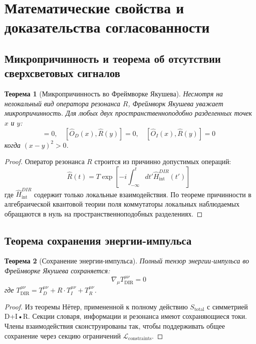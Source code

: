 \documentclass[11pt,a4paper]{article}
\newtheorem{theorem}{Теорема}
\begin{document}
	\section{Математические свойства и доказательства согласованности}
	\subsection{Микропричинность и теорема об отсутствии сверхсветовых сигналов}
	
	\begin{theorem}[Микропричинность во Фреймворке Якушева]
		Несмотря на нелокальный вид оператора резонанса $R$, Фреймворк Якушева уважает микропричинность. Для любых двух пространственноподобно разделенных точек $x$ и $y$:
		\begin{equation}
			[\hat{O}_D(x), \hat{O}_I(y)] = 0, \quad [\hat{O}_D(x), \hat{R}(y)] = 0, \quad [\hat{O}_I(x), \hat{R}(y)] = 0
		\end{equation}
		когда $(x-y)^2 > 0$.
	\end{theorem}
	
	\begin{proof}
		Оператор резонанса $R$ строится из причинно допустимых операций:
		\begin{equation}
			\hat{R}(t) = T \exp\left[ -i \int_{-\infty}^t dt' \hat{H}_{\text{int}}^{DIR}(t') \right]
		\end{equation}
		где $\hat{H}_{\text{int}}^{DIR}$ содержит только локальные взаимодействия. По теореме причинности в алгебраической квантовой теории поля коммутаторы локальных наблюдаемых обращаются в нуль на пространственноподобных разделениях.
	\end{proof}
	
	\subsection{Теорема сохранения энергии-импульса}
	
	\begin{theorem}[Сохранение энергии-импульса]
		Полный тензор энергии-импульса во Фреймворке Якушева сохраняется:
		\begin{equation}
			\boxed{\nabla_\mu T^{\mu\nu}_{\text{DIR}} = 0}
		\end{equation}
		где $T^{\mu\nu}_{\text{DIR}} = T^{\mu\nu}_D + R \cdot T^{\mu\nu}_I + T^{\mu\nu}_R$.
	\end{theorem}
	
	\begin{proof}
		Из теоремы Нётер, примененной к полному действию $S_{\text{total}}$ с симметрией D+I•R. Секции словаря, информации и резонанса имеют сохраняющиеся токи. Члены взаимодействия сконструированы так, чтобы поддерживать общее сохранение через секцию ограничений $\mathcal{L}_{\text{constraints}}$.
	\end{proof}
	
\end{document}
